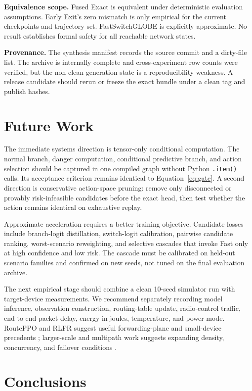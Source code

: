 \documentclass{ieeeaccess}
\newcommand{\FastSG}{FastSwitchGLOBE}
\begin{document}
\textbf{Equivalence scope.} Fused Exact is equivalent under deterministic evaluation assumptions. Early Exit's zero mismatch is only empirical for the current checkpoints and trajectory set. \FastSG{} is explicitly approximate. No result establishes formal safety for all reachable network states.

\textbf{Provenance.} The synthesis manifest records the source commit and a dirty-file list. The archive is internally complete and cross-experiment row counts were verified, but the non-clean generation state is a reproducibility weakness. A release candidate should rerun or freeze the exact bundle under a clean tag and publish hashes.

\section{Future Work}

The immediate systems direction is tensor-only conditional computation. The normal branch, danger computation, conditional predictive branch, and action selection should be captured in one compiled graph without Python \texttt{.item()} calls. Its acceptance criterion remains identical to Equation~\eqref{eq:gate}. A second direction is conservative action-space pruning: remove only disconnected or provably risk-infeasible candidates before the exact head, then test whether the action remains identical on exhaustive replay.

Approximate acceleration requires a better training objective. Candidate losses include branch-logit distillation, switch-logit calibration, pairwise candidate ranking, worst-scenario reweighting, and selective cascades that invoke Fast only at high confidence and low risk. The cascade must be calibrated on held-out scenario families and confirmed on new seeds, not tuned on the final evaluation archive.

The next empirical stage should combine a clean 10-seed simulator run with target-device measurements. We recommend separately recording model inference, observation construction, routing-table update, radio-control traffic, end-to-end packet delay, energy in joules, temperature, and power mode. RoutePPO and RLFR suggest useful forwarding-plane and small-device precedents \cite{curmen2026routeppo,li2024rlfr}; larger-scale and multipath work suggests expanding density, concurrency, and failover conditions \cite{zhang2026large,zhao2026multipath}.

\section{Conclusions}
\end{document}
